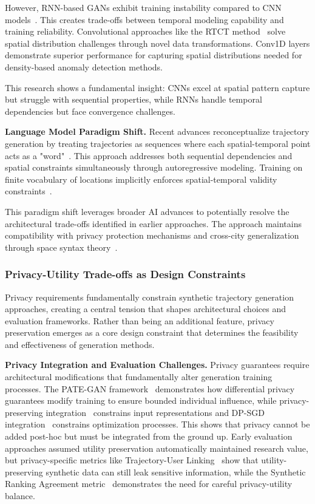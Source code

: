 \documentclass[runningheads]{llncs}
\begin{document}
However, RNN-based GANs exhibit training instability compared to CNN models~\cite{merhi2024synthetic}. This creates trade-offs between temporal modeling capability and training reliability. Convolutional approaches like the RTCT method~\cite{merhi2024synthetic} solve spatial distribution challenges through novel data transformations. Conv1D layers demonstrate superior performance for capturing spatial distributions needed for density-based anomaly detection methods.

This research shows a fundamental insight: CNNs excel at spatial pattern capture but struggle with sequential properties, while RNNs handle temporal dependencies but face convergence challenges.

\textbf{Language Model Paradigm Shift.} Recent advances reconceptualize trajectory generation by treating trajectories as sequences where each spatial-temporal point acts as a "word"~\cite{zhang2025end}. This approach addresses both sequential dependencies and spatial constraints simultaneously through autoregressive modeling. Training on finite vocabulary of locations implicitly enforces spatial-temporal validity constraints~\cite{kong2023mobility}.

This paradigm shift leverages broader AI advances to potentially resolve the architectural trade-offs identified in earlier approaches. The approach maintains compatibility with privacy protection mechanisms and cross-city generalization through space syntax theory~\cite{wang2025gtg}.

\subsubsection{Privacy-Utility Trade-offs as Design Constraints}

Privacy requirements fundamentally constrain synthetic trajectory generation approaches, creating a central tension that shapes architectural choices and evaluation frameworks. Rather than being an additional feature, privacy preservation emerges as a core design constraint that determines the feasibility and effectiveness of generation methods.

\textbf{Privacy Integration and Evaluation Challenges.} Privacy guarantees require architectural modifications that fundamentally alter generation training processes. The PATE-GAN framework~\cite{jordon2019pate} demonstrates how differential privacy guarantees modify training to ensure bounded individual influence, while privacy-preserving integration~\cite{rao2023cats} constrains input representations and DP-SGD integration~\cite{merhi2024synthetic} constrains optimization processes. This shows that privacy cannot be added post-hoc but must be integrated from the ground up. Early evaluation approaches assumed utility preservation automatically maintained research value, but privacy-specific metrics like Trajectory-User Linking~\cite{rao2023cats} show that utility-preserving synthetic data can still leak sensitive information, while the Synthetic Ranking Agreement metric~\cite{jordon2019pate} demonstrates the need for careful privacy-utility balance.
\end{document}
